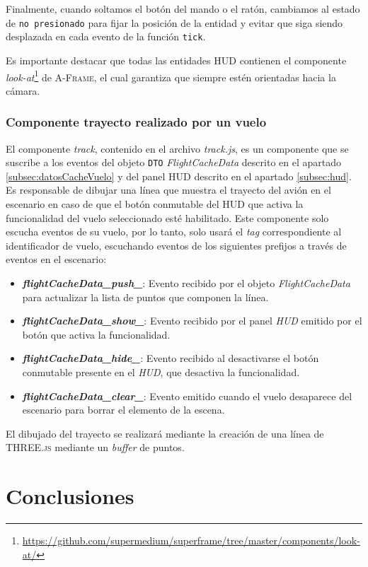 \documentclass[a4paper, 11pt]{book}
\begin{document}
Finalmente, cuando soltamos el botón del mando o el ratón, cambiamos al estado de  \texttt{no presionado} para fijar la posición de la entidad y evitar que siga siendo desplazada en cada evento de la función \texttt{tick}.

Es importante destacar que todas las entidades \textsc{\gls{HUD}} contienen el componente \emph{look-at}\footnote{\url{https://github.com/supermedium/superframe/tree/master/components/look-at/}} de \textsc{A-Frame}, el cual garantiza que siempre estén orientadas hacia la cámara.
\subsection{Componente trayecto realizado por un vuelo}
\label{subsec:track}
El componente \emph{track}, contenido en el archivo \emph{track.js}, es un componente que se suscribe a los eventos del objeto \texttt{\gls{DTO}} \emph{FlightCacheData} descrito en el apartado \ref{subsec:datosCacheVuelo} y del panel \textsc{\gls{HUD}} descrito en el apartado \ref{subsec:hud}.
Es responsable de dibujar una línea que muestra el trayecto del avión en el escenario en caso de que el botón conmutable del \textsc{\gls{HUD}} que activa la funcionalidad del vuelo seleccionado esté habilitado. Este componente solo escucha eventos de su vuelo, por lo tanto, solo usará el \emph{tag} correspondiente al identificador de vuelo, escuchando eventos de los siguientes prefijos a través de eventos en el escenario:
\begin{itemize}
	\item \textbf{\emph{flightCacheData\_push\_}}: Evento recibido por el objeto \emph{FlightCacheData} para actualizar la lista de puntos que componen la línea.
	\item \textbf{\emph{flightCacheData\_show\_}}: Evento recibido por el panel \emph{HUD} emitido por el botón que activa la funcionalidad.
	\item \textbf{\emph{flightCacheData\_hide\_}}: Evento recibido al desactivarse el botón conmutable presente en el \emph{HUD}, que desactiva la funcionalidad.
	\item \textbf{\emph{flightCacheData\_clear\_}}: Evento emitido cuando el vuelo desaparece del escenario para borrar el elemento de la escena.
\end{itemize}
El dibujado del trayecto se realizará mediante la creación de una línea de \textsc{THREE.js} mediante un \emph{buffer} de puntos.
\chapter{Conclusiones}
\label{chap:conclusiones}
\end{document}
